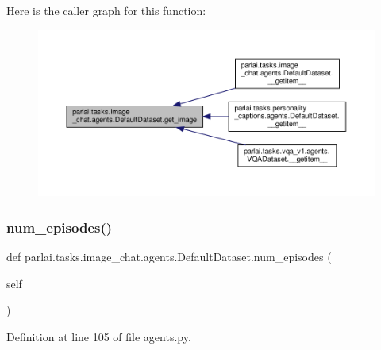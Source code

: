Here is the caller graph for this function\+:
\nopagebreak
\begin{figure}[H]
\begin{center}
\leavevmode
\includegraphics[width=350pt]{classparlai_1_1tasks_1_1image__chat_1_1agents_1_1DefaultDataset_ad06939ed5ac1393185d8e4eb1cf1706e_icgraph}
\end{center}
\end{figure}
\mbox{\label{classparlai_1_1tasks_1_1image__chat_1_1agents_1_1DefaultDataset_afd35ea4ecd0e16f58eceb52317da429e}} 
\subsubsection{\texorpdfstring{num\+\_\+episodes()}{num\_episodes()}}
{\footnotesize\ttfamily def parlai.\+tasks.\+image\+\_\+chat.\+agents.\+Default\+Dataset.\+num\+\_\+episodes (\begin{DoxyParamCaption}\item[{}]{self }\end{DoxyParamCaption})}



Definition at line 105 of file agents.\+py.



